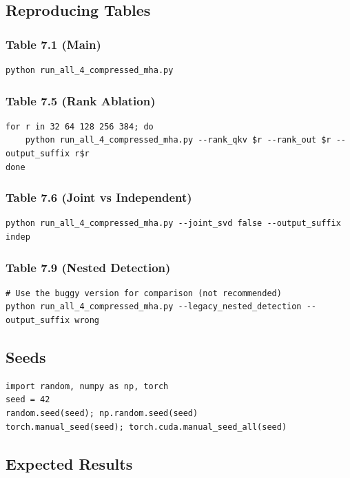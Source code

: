 \subsection{Reproducing Tables}

\subsubsection{Table 7.1 (Main)}
\begin{lstlisting}
python run_all_4_compressed_mha.py
\end{lstlisting}

\subsubsection{Table 7.5 (Rank Ablation)}
\begin{lstlisting}
for r in 32 64 128 256 384; do
    python run_all_4_compressed_mha.py --rank_qkv $r --rank_out $r --output_suffix r$r
done
\end{lstlisting}

\subsubsection{Table 7.6 (Joint vs Independent)}
\begin{lstlisting}
python run_all_4_compressed_mha.py --joint_svd false --output_suffix indep
\end{lstlisting}

\subsubsection{Table 7.9 (Nested Detection)}
\begin{lstlisting}
# Use the buggy version for comparison (not recommended)
python run_all_4_compressed_mha.py --legacy_nested_detection --output_suffix wrong
\end{lstlisting}

\subsection{Seeds}

\begin{lstlisting}
import random, numpy as np, torch
seed = 42
random.seed(seed); np.random.seed(seed)
torch.manual_seed(seed); torch.cuda.manual_seed_all(seed)
\end{lstlisting}

\subsection{Expected Results}

